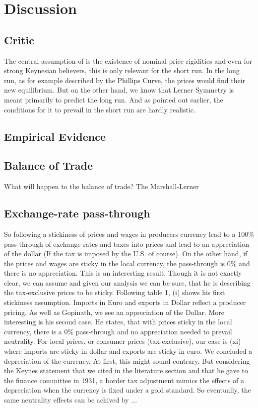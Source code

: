 \section{Discussion} \label{discussion}
\subsection{Critic}
The central assumption of \cite{buiter2017exchange} is the existence of nominal price rigidities and even for strong Keynesian believers, this is only relevant for the short run. In the long run, as for example described by the Phillips Curve, the prices would find their new equilibrium. But on the other hand, we know that Lerner Symmetry is meant primarily to predict the long run. And as pointed out earlier, the conditions for it to prevail in the short run are hardly realistic. 



\subsection{Empirical Evidence}
\subsection{Balance of Trade}
What will happen to the balance of trade?
The Marshall-Lerner 
\subsection{Exchange-rate pass-through}
So following \cite{gopinath2017macroeconomic} a stickiness of prices and wages in producers currency lead to a 100\% pass-through of exchange rates and taxes into prices and lead to an appreciation of the dollar (If the tax is imposed by the U.S. of course). On the other hand, if the prices and wages are sticky in the local currency, the pass-through is 0\% and there is no appreciation. This is an interesting result. Though it is not exactly clear, we can assume and given our analysis we can be sure, that he is describing the tax-exclusive prices to be sticky. Following table 1, (i) shows his first stickiness assumption. Imports in Euro and exports in Dollar reflect a producer pricing. As well as Gopinath, we see an appreciation of the Dollar. More interesting is his second case. He states, that with prices sticky in the local currency, there is a 0\% pass-through and no appreciation needed to prevail neutrality. For local prices, or consumer prices (tax-exclusive), our case is (xi) where imports are sticky in dollar and exports are sticky in euro. We concluded a depreciation of the currency. At first, this might sound contrary. But considering the Keynes statement that we cited in the literature section and that he gave to the finance committee in 1931, a border tax adjustment mimics the effects of a depreciation when the currency is fixed under a gold standard.  So eventually, the same neutrality effects can be achived by ...

